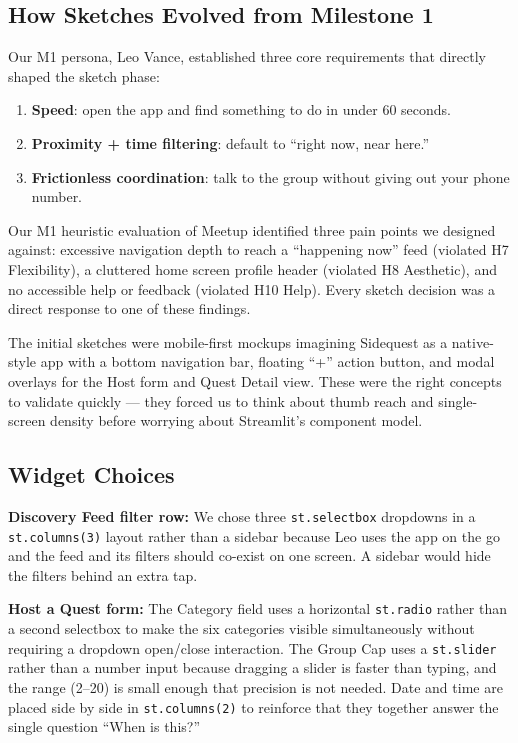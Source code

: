 \documentclass[11pt]{article}
\begin{document}
\subsection{How Sketches Evolved from Milestone 1}

Our M1 persona, Leo Vance, established three core requirements that directly shaped the sketch phase:

\begin{enumerate}
    \item \textbf{Speed}: open the app and find something to do in under 60 seconds.
    \item \textbf{Proximity + time filtering}: default to ``right now, near here.''
    \item \textbf{Frictionless coordination}: talk to the group without giving out your phone number.
\end{enumerate}

Our M1 heuristic evaluation of Meetup identified three pain points we designed against: excessive navigation depth to reach a ``happening now'' feed (violated H7 Flexibility), a cluttered home screen profile header (violated H8 Aesthetic), and no accessible help or feedback (violated H10 Help). Every sketch decision was a direct response to one of these findings.

The initial sketches were mobile-first mockups imagining Sidequest as a native-style app with a bottom navigation bar, floating ``+'' action button, and modal overlays for the Host form and Quest Detail view. These were the right concepts to validate quickly --- they forced us to think about thumb reach and single-screen density before worrying about Streamlit's component model.

\subsection{Widget Choices}

\textbf{Discovery Feed filter row:} We chose three \texttt{st.selectbox} dropdowns in a \texttt{st.columns(3)} layout rather than a sidebar because Leo uses the app on the go and the feed and its filters should co-exist on one screen. A sidebar would hide the filters behind an extra tap.

\textbf{Host a Quest form:} The Category field uses a horizontal \texttt{st.radio} rather than a second selectbox to make the six categories visible simultaneously without requiring a dropdown open/close interaction. The Group Cap uses a \texttt{st.slider} rather than a number input because dragging a slider is faster than typing, and the range (2--20) is small enough that precision is not needed. Date and time are placed side by side in \texttt{st.columns(2)} to reinforce that they together answer the single question ``When is this?''
\end{document}
